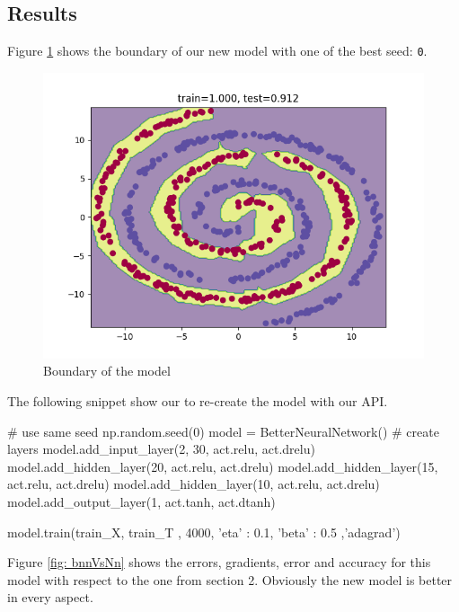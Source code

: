 \documentclass[11pt]{article}
\begin{document}
\subsection{Results}
Figure \ref{fig: results_boundary} shows the boundary of our new model with one of the best seed: \texttt{0}.
\begin{figure}[H]
\centering
\includegraphics[scale=0.6]{images/competition/competition_0.png}	
\caption{Boundary of the model}
\label{fig: results_boundary}
\end{figure}

The following snippet show our to re-create the model with our API.
\begin{python}
# use same seed
np.random.seed(0)
model = BetterNeuralNetwork()
# create layers
model.add_input_layer(2, 30, act.relu, act.drelu)
model.add_hidden_layer(20, act.relu, act.drelu)
model.add_hidden_layer(15, act.relu, act.drelu)
model.add_hidden_layer(10, act.relu, act.drelu)
model.add_output_layer(1, act.tanh, act.dtanh)

model.train(train_X, train_T , 4000, { 'eta' : 0.1, 'beta' : 0.5 },'adagrad')
\end{python}


Figure \ref{fig: bnnVsNn} shows the errors, gradients, error and accuracy for this model with respect to the one from section 2. Obviously the new model is better in every aspect.
\end{document}
